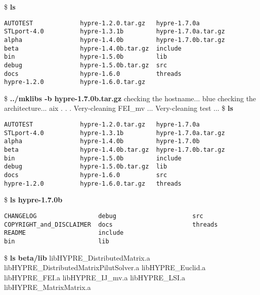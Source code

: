 \begin{ttfamily}
\begin{mdseries}
\$ \textbf{ls}\linebreak
\begin{verbatim}
AUTOTEST             hypre-1.2.0.tar.gz   hypre-1.7.0a
STLport-4.0          hypre-1.3.1b         hypre-1.7.0a.tar.gz
alpha                hypre-1.4.0b         hypre-1.7.0b.tar.gz
beta                 hypre-1.4.0b.tar.gz  include
bin                  hypre-1.5.0b         lib
debug                hypre-1.5.0b.tar.gz  src
docs                 hypre-1.6.0          threads
hypre-1.2.0          hypre-1.6.0.tar.gz
\end{verbatim}
\$ \textbf{../mklibs -b hypre-1.7.0b.tar.gz}\linebreak
checking the hostname... blue\linebreak
checking the architecture... aix\linebreak
 . . .\linebreak
Very-cleaning FEI\_mv ...\linebreak
Very-cleaning test ...\linebreak
\$ \textbf{ls}\linebreak
\begin{verbatim}
AUTOTEST             hypre-1.2.0.tar.gz   hypre-1.7.0a
STLport-4.0          hypre-1.3.1b         hypre-1.7.0a.tar.gz
alpha                hypre-1.4.0b         hypre-1.7.0b
beta                 hypre-1.4.0b.tar.gz  hypre-1.7.0b.tar.gz
bin                  hypre-1.5.0b         include
debug                hypre-1.5.0b.tar.gz  lib
docs                 hypre-1.6.0          src
hypre-1.2.0          hypre-1.6.0.tar.gz   threads
\end{verbatim}
\$ \textbf{ls hypre-1.7.0b}\linebreak
\begin{verbatim}
CHANGELOG                 debug                     src
COPYRIGHT_and_DISCLAIMER  docs                      threads
README                    include
bin                       lib
\end{verbatim}
\$ \textbf{ls beta/lib}\linebreak
libHYPRE\_DistributedMatrix.a\linebreak
libHYPRE\_DistributedMatrixPilutSolver.a\linebreak
libHYPRE\_Euclid.a\linebreak
libHYPRE\_FEI.a\linebreak
libHYPRE\_IJ\_mv.a\linebreak
libHYPRE\_LSI.a\linebreak
libHYPRE\_MatrixMatrix.a\linebreak

\end{mdseries}
\end{ttfamily}
